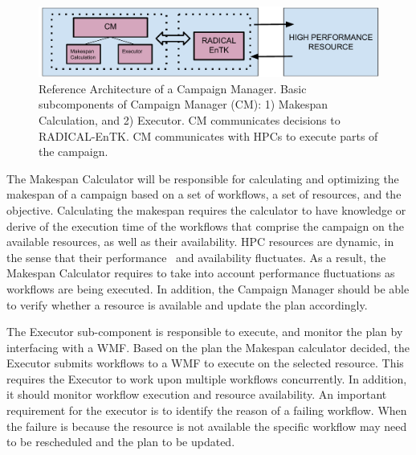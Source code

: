 \begin{figure}[t]
    \centering
    \includegraphics[width=.95\textwidth]{figures/CEM_RefArch.pdf}
    \caption{Reference Architecture of a Campaign Manager. Basic 
    subcomponents of Campaign Manager (CM): 1) Makespan Calculation, and 2) Executor. 
    CM communicates decisions to RADICAL-EnTK. CM communicates with HPCs to 
    execute parts of the campaign.}\label{fig:refarch}
\end{figure}

The Makespan Calculator will be responsible for calculating and optimizing the makespan of a campaign based on a set of workflows, a set of resources, and the objective.
Calculating the makespan requires the calculator to have knowledge or derive of the execution time of the workflows that comprise the campaign on the available resources, as well as their availability.
HPC resources are dynamic, in the sense that their performance~\cite{pouchard2019computational} and availability fluctuates.
As a result, the Makespan Calculator requires to take into account performance fluctuations as workflows are being executed.
In addition, the Campaign Manager should be able to verify whether a resource is available and update the plan accordingly.

The Executor sub-component is responsible to execute, and monitor the plan by interfacing with a WMF.
Based on the plan the Makespan calculator decided, the Executor submits workflows to a WMF to execute on the selected resource.
This requires the Executor to work upon multiple workflows concurrently.
In addition, it should monitor workflow execution and resource availability.
An important requirement for the executor is to identify the reason of a failing workflow.
When the failure is because the resource is not available the specific workflow may need to be rescheduled and the plan to be updated.

